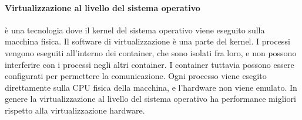 \paragraph{Virtualizzazione al livello del sistema operativo}
\`e una tecnologia dove il kernel del sistema operativo viene eseguito sulla macchina fisica. Il software di virtualizzazione \`e una parte del kernel. I processi vengono eseguiti all'interno dei container, che sono isolati fra loro, e non possono interferire con i processi negli altri container. I container tuttavia possono essere configurati per permettere la comunicazione.
Ogni processo viene esegito direttamente sulla CPU fisica della macchina, e l'hardware non viene emulato.
In genere la virtualizzazione al livello del sistema operativo ha performance migliori rispetto alla virtualizzazione hardware.

